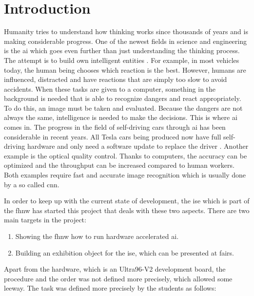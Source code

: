 \chapter*{Introduction}
\label{ch:introduction}

Humanity tries to understand how thinking works since thousands of years and is making considerable progress.
One of the newest fields in science and engineering is the \acrfull{ai} which goes even further than just understanding the thinking process.
The attempt is to build own intelligent entities \cite{ai}.
For example, in most vehicles today, the human being chooses which reaction is the best.
However, humans are influenced, distracted and have reactions that are simply too slow to avoid accidents.
When these tasks are given to a computer, something in the background is needed that is able to recognize dangers and react appropriately.
To do this, an image must be taken and evaluated.
Because the dangers are not always the same, intelligence is needed to make the decisions.
This is where \acrshort{ai} comes in.
The progress in the field of self-driving cars through \acrshort{ai} has been considerable in recent years.
All Tesla cars being produced now have full self-driving hardware and only need a software update to replace the driver \cite{tesla_self_driving_cars}.
Another example is the optical quality control.
Thanks to computers, the accuracy can be optimized and the throughput can be increased compared to human workers.
Both examples require fast and accurate image recognition which is usually done by a so called \acrfull{cnn}. 

In order to keep up with the current state of development, the \acrfull{ise} which is part of the \acrfull{fhnw} has started this project that deals with these two aspects.
There are two main targets in the project:

\begin{enumerate}
	\item Showing the \acrshort{fhnw} how to run hardware accelerated \acrshort{ai}.
	\item Building an exhibition object for the \acrshort{ise}, which can be presented at fairs. 
\end{enumerate}

Apart from the hardware, which is an Ultra96-V2 development board, the procedure and the order was not defined more precisely, which allowed some leeway.
The task was defined more precisely by the students as follows:


